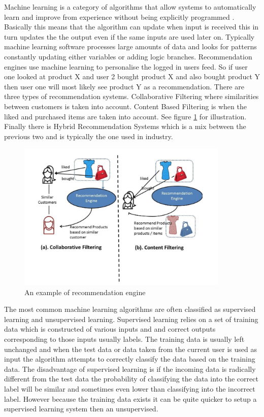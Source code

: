 Machine learning is a category of algorithms that allow systems to automatically learn and improve from experience without being explicitly programmed \cite{machineLearning}. Basically this means that the algorithm can update when input is received this in turn updates the the output even if the same inputs are used later on.
Typically machine learning software processes large amounts of data and looks for patterns constantly updating either variables or adding logic branches. Recommendation engines use machine learning to personalise the logged in users feed. So if user one looked at product X and user 2 bought product X and also bought product Y then user one will most likely see product Y as a recommendation. There are three types of recommendation systems. Collaborative Filtering \cite{recommendation} where similarities between customers is taken into account.
Content Based Filtering \cite{recommendation} is when the liked and purchased items are taken into account. See figure \ref{fig:recommendation} for illustration.
Finally there is Hybrid Recommendation Systems which is a mix between the previous two and is typically the one used in industry.

\begin{figure}[ht]
  \centering
      \includegraphics[width=0.9\textwidth]{Figures/recommendationEngine.png}
  \caption[An example of recommendation engine]{An example of recommendation engine\cite{recommendation}}
  \label{fig:recommendation}
\end{figure}

The most common machine learning algorithms are often classified as supervised learning and unsupervised learning.
Supervised learning \cite{supervised} relies on a set of training data which is constructed of various inputs and and correct outputs corresponding to those inputs usually labels. The training data is usually left unchanged and when the test data or data taken from the current user is used as input the algorithm attempts to correctly classify the data based on the training data. The disadvantage of supervised learning is if the incoming data is radically different from the test data the probability of classifying the data into the correct label will be similar and sometimes even lower than classifying into the incorrect label. However because the training data exists it can be quite quicker to setup a supervised learning system then an unsupervised.

